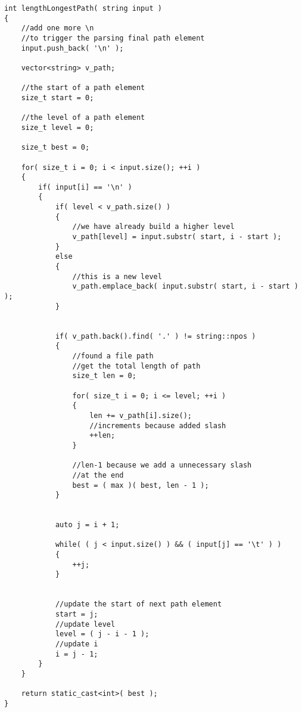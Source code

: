 \setcounter{lstlisting}{0}
\begin{lstlisting}[style=customc, caption={Tree}]
int lengthLongestPath( string input )
{
    //add one more \n
    //to trigger the parsing final path element
    input.push_back( '\n' );

    vector<string> v_path;

    //the start of a path element
    size_t start = 0;

    //the level of a path element
    size_t level = 0;

    size_t best = 0;

    for( size_t i = 0; i < input.size(); ++i )
    {
        if( input[i] == '\n' )
        {
            if( level < v_path.size() )
            {
                //we have already build a higher level
                v_path[level] = input.substr( start, i - start );
            }
            else
            {
                //this is a new level
                v_path.emplace_back( input.substr( start, i - start ) );
            }


            if( v_path.back().find( '.' ) != string::npos )
            {
                //found a file path
                //get the total length of path
                size_t len = 0;

                for( size_t i = 0; i <= level; ++i )
                {
                    len += v_path[i].size();
                    //increments because added slash
                    ++len;
                }

                //len-1 because we add a unnecessary slash
                //at the end
                best = ( max )( best, len - 1 );
            }


            auto j = i + 1;

            while( ( j < input.size() ) && ( input[j] == '\t' ) )
            {
                ++j;
            }


            //update the start of next path element
            start = j;
            //update level
            level = ( j - i - 1 );
            //update i
            i = j - 1;
        }
    }

    return static_cast<int>( best );
}
\end{lstlisting}